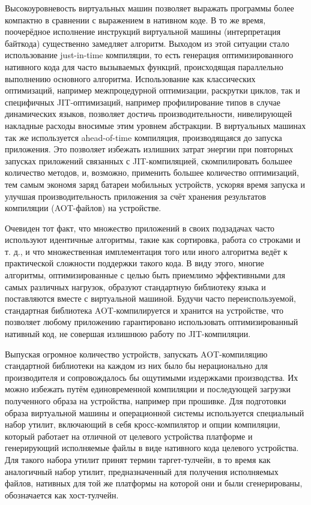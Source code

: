 \par
Высокоуровневость виртуальных машин позволяет выражать программы более компактно в сравнении с выражением в нативном коде.
В то же время, поочерёдное исполнение инструкций виртуальной машины (интерпретация байткода) существенно замедляет алгоритм.
Выходом из этой ситуации стало использование just-in-time компиляции, то есть генерация оптимизированного нативного кода для часто вызываемых функций, происходящая параллельно выполнению основного алгоритма.
Использование как классических оптимизаций, например межпроцедурной оптимизации, раскрутки циклов, так и специфичных JIT-оптимизаций, например профилирование типов в случае динамических языков, позволяет достичь производительности, нивелирующей накладные расходы вносимые этим уровнем абстракции.
В виртуальных машинах так же используется ahead-of-time компиляция, производящаяся до запуска приложения.
Это позволяет избежать излишних затрат энергии при повторных запусках приложений связанных с JIT-компиляцией, скомпилировать большее количество методов, и, возможно, применить большее количество оптимизаций, тем самым экономя заряд батареи мобильных устройств, ускоряя время запуска и улучшая производительность приложения за счёт хранения результатов компиляции (AOT-файлов) на устройстве.

\par
Очевиден тот факт, что множество приложений в своих подзадачах часто используют идентичные алгоритмы, такие как сортировка, работа со строками и т. д., и что множественная имплементация того или иного алгоритма ведёт к практической сложности поддержки такого кода.
В виду этого, многие алгоритмы, оптимизированные с целью быть приемлимо эффективными для самых различных нагрузок, образуют стандартную библиотеку языка и поставляются вместе с виртуальной машиной.
Будучи часто переиспользуемой, стандартная библиотека AOT-компилируется и хранится на устройстве, что позволяет любому приложению гарантировано использовать оптимизированный нативный код, не совершая излишнюю работу по JIT-компиляции.

\par
Выпуская огромное количество устройств, запускать AOT-компиляцию стандартной библиотеки на каждом из них было бы нерационально для производителя и сопровождалось бы ощутимыми издержками производства.
Их можно избежать путём единовременной компиляции и последующей загрузки полученного образа на устройства, например при прошивке.
Для подготовки образа виртуальной машины и операционной системы используется специальный набор утилит, включающий в себя кросс-компилятор и опции компиляции, который работает на отличной от целевого устройства платформе и генерирующий исполняемые файлы в виде нативного кода целевого устройства.
Для такого набора утилит принят термин таргет-тулчейн, в то время как аналогичный набор утилит, предназначенный для получения исполняемых файлов, нативных для той же платформы на которой они и были сгенерированы, обозначается как хост-тулчейн.

